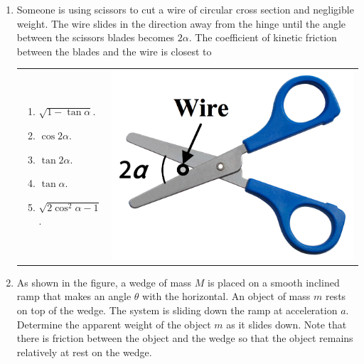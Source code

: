 \documentclass[12pt,letterpaper]{article}
\begin{document}
\begin{enumerate}[resume]
\item
Someone is using scissors to cut a wire of circular cross section and negligible weight. The wire slides in the direction away from the hinge until the angle between the scissors blades becomes $2\alpha$. The coefficient of kinetic friction between the blades and the wire is closest to

\begin{tabular}{l r}

\begin{minipage}{0.65\textwidth}
\begin{enumerate}
\item $\sqrt{1-\tan\alpha}$.
\item $\cos{2\alpha}$.
\item $\tan{2\alpha}$.
\item $\tan\alpha$.
\item $\sqrt{2\cos^2\alpha - 1}$.
\end{enumerate}
\end{minipage} &
\begin{minipage}{0.25\textwidth}
\includegraphics[width=\textwidth,left]{scissors.png}
\end{minipage}
\end{tabular}

\item
As shown in the figure, a wedge of mass $M$ is placed on a smooth inclined ramp that makes an angle $\theta$ with the horizontal. An object of mass $m$ rests on top of the wedge. The system is sliding down the ramp at acceleration $a$. Determine the apparent weight of the object $m$ as it slides down. Note that there is friction between the object and the wedge so that the object remains relatively at rest on the wedge.


\end{enumerate}
\end{document}
